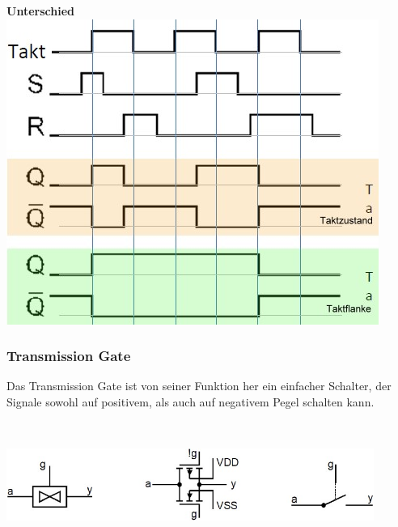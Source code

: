 \begin{multicols}{3}
			\textbf{Unterschied}\\
			\includegraphics[width=0.8\columnwidth]{pics/flipflop_latch}
			\columnbreak
			
		\end{multicols}
			
		
	\subsubsection{Transmission Gate}
		\begin{minipage}{10 cm}
			Das Transmission Gate ist von seiner Funktion her ein einfacher Schalter, der Signale sowohl auf positivem, als auch auf negativem Pegel schalten kann.
		\end{minipage}
		\begin{minipage}{0.5 cm}
			\ 
		\end{minipage}
		\begin{minipage}{8 cm}
			\includegraphics[width=0.9\textwidth]{pics/transmissiongate}
		\end{minipage}
		
